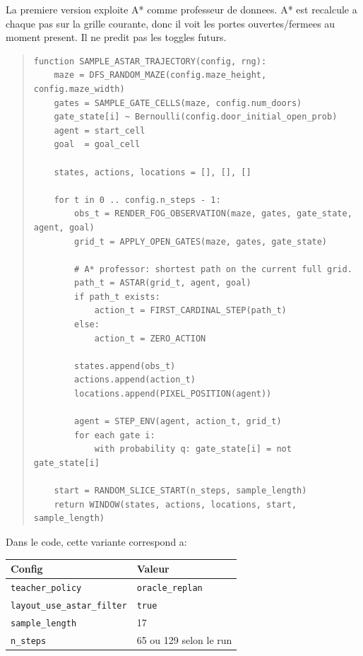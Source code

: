 \documentclass[11pt,a4paper]{article}
\newcommand{\code}[1]{\texttt{#1}}
\begin{document}
La premiere version exploite A* comme professeur de donnees. A* est recalcule a
chaque pas sur la grille courante, donc il voit les portes ouvertes/fermees au
moment present. Il ne predit pas les toggles futurs.

\begin{quote}
\small
\begin{verbatim}
function SAMPLE_ASTAR_TRAJECTORY(config, rng):
    maze = DFS_RANDOM_MAZE(config.maze_height, config.maze_width)
    gates = SAMPLE_GATE_CELLS(maze, config.num_doors)
    gate_state[i] ~ Bernoulli(config.door_initial_open_prob)
    agent = start_cell
    goal  = goal_cell

    states, actions, locations = [], [], []

    for t in 0 .. config.n_steps - 1:
        obs_t = RENDER_FOG_OBSERVATION(maze, gates, gate_state, agent, goal)
        grid_t = APPLY_OPEN_GATES(maze, gates, gate_state)

        # A* professor: shortest path on the current full grid.
        path_t = ASTAR(grid_t, agent, goal)
        if path_t exists:
            action_t = FIRST_CARDINAL_STEP(path_t)
        else:
            action_t = ZERO_ACTION

        states.append(obs_t)
        actions.append(action_t)
        locations.append(PIXEL_POSITION(agent))

        agent = STEP_ENV(agent, action_t, grid_t)
        for each gate i:
            with probability q: gate_state[i] = not gate_state[i]

    start = RANDOM_SLICE_START(n_steps, sample_length)
    return WINDOW(states, actions, locations, start, sample_length)
\end{verbatim}
\end{quote}

Dans le code, cette variante correspond a:

\begin{center}
\begin{tabular}{ll}
\toprule
Config & Valeur \\
\midrule
\code{teacher\_policy} & \code{oracle\_replan} \\
\code{layout\_use\_astar\_filter} & \code{true} \\
\code{sample\_length} & 17 \\
\code{n\_steps} & 65 ou 129 selon le run \\
\bottomrule
\end{tabular}
\end{center}
\end{document}
